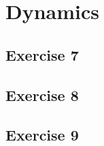 \begin{solution}
    \lipsum[12]
\end{solution}

\section{Dynamics}
\subsection{Exercise 7}
\lipsum[13]

\begin{solution}
    \lipsum[14]
\end{solution}

\subsection{Exercise 8}
\lipsum[15]

\begin{solution}
    \lipsum[16]
\end{solution}

\subsection{Exercise 9}
\lipsum[17]

\begin{solution}
    \lipsum[18]
\end{solution}
